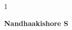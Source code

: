\begin{spacing}{1}
		
	\end{spacing}
	\begin{flushright}
		\textbf{Nandhaakishore S}\\
	\end{flushright}